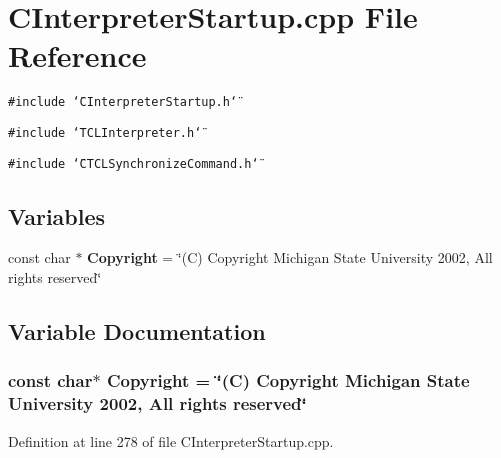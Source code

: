 \section{CInterpreter\-Startup.cpp File Reference}
\label{CInterpreterStartup_8cpp}
{\tt \#include \char`\"{}CInterpreter\-Startup.h\char`\"{}}\par
{\tt \#include \char`\"{}TCLInterpreter.h\char`\"{}}\par
{\tt \#include \char`\"{}CTCLSynchronize\-Command.h\char`\"{}}\par
\subsection*{Variables}
\begin{CompactItemize}
\item 
const char $\ast$ {\bf Copyright} = \char`\"{}(C) Copyright Michigan State University 2002, All rights reserved\char`\"{}
\end{CompactItemize}


\subsection{Variable Documentation}
\subsubsection{\setlength{\rightskip}{0pt plus 5cm}const char$\ast$ Copyright = \char`\"{}(C) Copyright Michigan State University 2002, All rights reserved\char`\"{}\hspace{0.3cm}{\tt  [static]}}\label{CInterpreterStartup_8cpp_a0}




Definition at line 278 of file CInterpreter\-Startup.cpp.